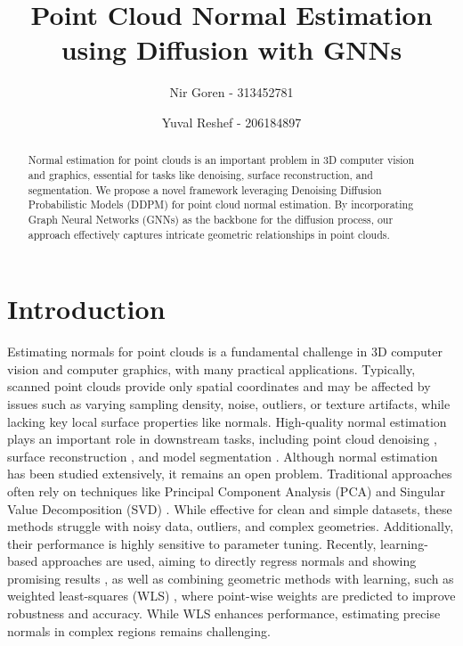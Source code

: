 \documentclass{acmart}
\title{Point Cloud Normal Estimation using Diffusion with GNNs}
\author{Nir Goren - 313452781}
\author{Yuval Reshef - 206184897}
\date{}
\newcommand{\instructions}[1]{\textcolor{red}{#1}\newline}
\renewcommand{\instructions}[1]{}    %
\begin{document}
\begin{abstract}
\instructions{TL;DR of this project -  one paragraph}
Normal estimation for point clouds is an important problem in 3D computer vision and graphics, essential for tasks like denoising, surface reconstruction, and segmentation. We propose a novel framework leveraging Denoising Diffusion Probabilistic Models (DDPM) for point cloud normal estimation. By incorporating Graph Neural Networks (GNNs) as the backbone for the diffusion process, our approach effectively captures intricate geometric relationships in point clouds.
\end{abstract}
\maketitle

\section{Introduction}
\instructions{Explain the background and the problem you are trying to solve in this project - 0.5-1 page}
Estimating normals for point clouds is a fundamental challenge in 3D computer vision and computer graphics, with many practical applications. Typically, scanned point clouds provide only spatial coordinates and may be affected by issues such as varying sampling density, noise, outliers, or texture artifacts, while lacking key local surface properties like normals. High-quality normal estimation plays an important role in downstream tasks, including point cloud denoising \cite{lu2020deep,lu2020low}, surface reconstruction \cite{kazhdan2006poisson,fleishman2005robust}, and model segmentation \cite{che2018multi}.
Although normal estimation has been studied extensively, it remains an open problem. Traditional approaches often rely on techniques like Principal Component Analysis (PCA) \cite{hoppe1992surface} and Singular Value Decomposition (SVD) \cite{pauly2002efficient}. While effective for clean and simple datasets, these methods struggle with noisy data, outliers, and complex geometries. Additionally, their performance is highly sensitive to parameter tuning.
Recently, learning-based approaches are used, aiming to directly regress normals and showing promising results \cite{guerrero2018pcpnet,ben2019nesti,zhou2020geometry,wang2020neighbourhood,hashimoto2019normal}, as well as combining geometric methods with learning, such as weighted least-squares (WLS) \cite{lenssen2020deep,ben2020deepfit,zhang2022geometry,zhu2021adafit}, where point-wise weights are predicted to improve robustness and accuracy. While WLS enhances performance, estimating precise normals in complex regions remains challenging.
\end{document}
